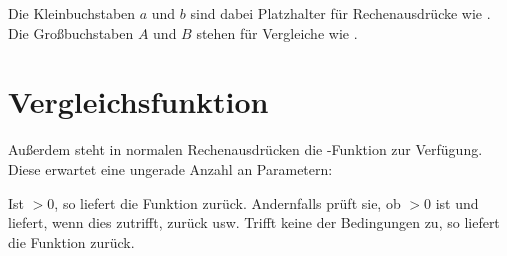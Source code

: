 Die Kleinbuchstaben $a$ und $b$ sind dabei Platzhalter für Rechenausdrücke wie .
Die Großbuchstaben $A$ und $B$ stehen für Vergleiche wie .



\section{Vergleichsfunktion}

Außerdem steht in normalen Rechenausdrücken die -Funktion zur Verfügung. Diese erwartet eine
ungerade Anzahl an Parametern:


Ist $>0$, so liefert die Funktion  zurück.
Andernfalls prüft sie, ob $>0$ ist und liefert, wenn dies zutrifft,  zurück usw.
Trifft keine der Bedingungen zu, so liefert die Funktion  zurück.
